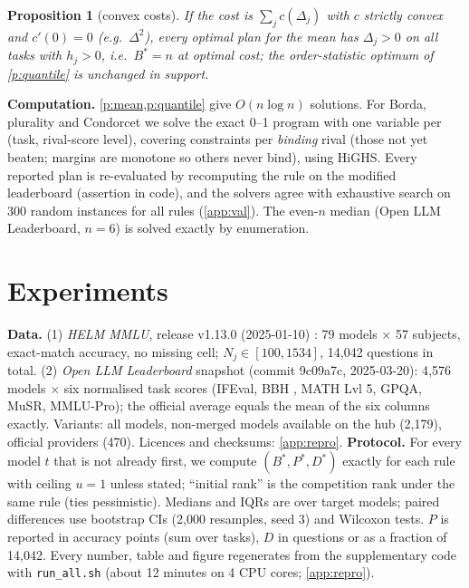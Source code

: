\documentclass{article}
\theoremstyle{plain}
\newtheorem{proposition}{Proposition}
\theoremstyle{definition}
\theoremstyle{remark}
\newcommand{\Bst}{B^{\ast}}
\newcommand{\Pst}{P^{\ast}}
\newcommand{\Dst}{D^{\ast}}
\begin{document}
\begin{proposition}[convex costs]\label{p:convex}
If the cost is $\sum_jc(\Delta_j)$ with $c$ strictly convex and $c'(0)=0$ (e.g.\ $\Delta^2$), every optimal plan for the mean has $\Delta_j>0$ on all tasks with $h_j>0$, i.e.\ $\Bst=n$ at optimal cost; the order-statistic optimum of \cref{p:quantile} is unchanged in support.
\end{proposition}
\textbf{Computation.} \cref{p:mean,p:quantile} give $O(n\log n)$ solutions. For Borda, plurality and Condorcet we solve the exact 0--1 program with one variable per (task, rival-score level), covering constraints per \emph{binding} rival (those not yet beaten; margins are monotone so others never bind), using HiGHS. Every reported plan is re-evaluated by recomputing the rule on the modified leaderboard (assertion in code), and the solvers agree with exhaustive search on 300 random instances for all rules (\cref{app:val}). The even-$n$ median (Open LLM Leaderboard, $n=6$) is solved exactly by enumeration.

\section{Experiments}\label{sec:exp}
\textbf{Data.} (1) \emph{HELM MMLU}, release v1.13.0 (2025-01-10) \cite{helm2025mmlu}: 79 models $\times$ 57 subjects, exact-match accuracy, no missing cell; $N_j\in[100,1534]$, 14{,}042 questions in total. (2) \emph{Open LLM Leaderboard} \cite{olb2025contents} snapshot (commit 9c09a7c, 2025-03-20): 4{,}576 models $\times$ six normalised task scores (IFEval, BBH \cite{suzgun2022bbh}, MATH Lvl 5, GPQA, MuSR, MMLU-Pro); the official average equals the mean of the six columns exactly. Variants: all models, non-merged models available on the hub (2{,}179), official providers (470). Licences and checksums: \cref{app:repro}.
\textbf{Protocol.} For every model $t$ that is not already first, we compute $(\Bst,\Pst,\Dst)$ exactly for each rule with ceiling $u=1$ unless stated; ``initial rank'' is the competition rank under the same rule (ties pessimistic). Medians and IQRs are over target models; paired differences use bootstrap CIs (2{,}000 resamples, seed 3) and Wilcoxon tests. $P$ is reported in accuracy points (sum over tasks), $D$ in questions or as a fraction of 14{,}042. Every number, table and figure regenerates from the supplementary code with \texttt{run\_all.sh} (about 12 minutes on 4 CPU cores; \cref{app:repro}).
\end{document}

